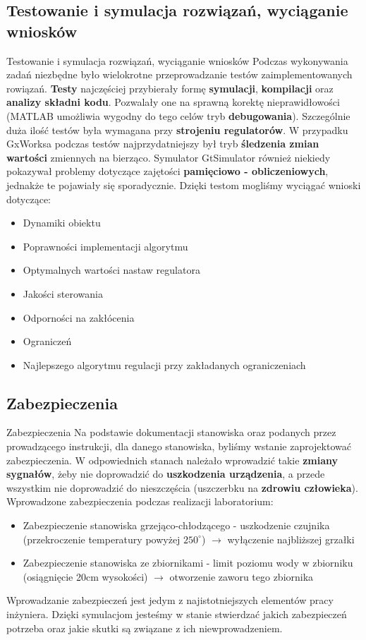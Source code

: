\documentclass{beamer}
\begin{document}
	\subsection{Testowanie i symulacja rozwiązań, wyciąganie wniosków}
	\begin{frame}{Testowanie i symulacja rozwiązań, wyciąganie wniosków}
		Podczas wykonywania zadań niezbędne było wielokrotne przeprowadzanie testów zaimplementowanych rowiązań. \textbf{Testy} najczęściej przybierały formę \textbf{symulacji}, \textbf{kompilacji} oraz \textbf{analizy składni kodu}. Pozwalały one na sprawną korektę nieprawidłowości (MATLAB umożliwia wygodny do tego celów tryb \textbf{debugowania}). Szczególnie duża ilość testów była wymagana przy \textbf{strojeniu regulatorów}. W przypadku GxWorksa podczas testów najprzydatniejszy był tryb \textbf{śledzenia zmian wartości} zmiennych na bierząco. Symulator GtSimulator również niekiedy pokazywał problemy dotyczące zajętości \textbf{pamięciowo - obliczeniowych}, jednakże te pojawiały się sporadycznie. Dzięki testom mogliśmy wyciągać wnioski dotyczące:
		\begin{itemize}
			\item Dynamiki obiektu
			\item Poprawności implementacji algorytmu
			\item Optymalnych wartości nastaw regulatora
			\item Jakości sterowania
			\item Odporności na zakłócenia
			\item Ograniczeń
			\item Najlepszego algorytmu regulacji przy zakładanych ograniczeniach
		\end{itemize}
	\end{frame}
	
	\subsection{Zabezpieczenia}
	\begin{frame}{Zabezpieczenia}
		Na podstawie dokumentacji stanowiska oraz podanych przez prowadzącego instrukcji, dla danego stanowiska, byliśmy wstanie zaprojektować zabezpieczenia. W odpowiednich stanach należało wprowadzić takie \textbf{zmiany sygnałów}, żeby nie doprowadzić do \textbf{uszkodzenia urządzenia}, a przede wszystkim nie doprowadzić do nieszczęścia (uszczerbku na \textbf{zdrowiu człowieka}). Wprowadzone zabezpieczenia podczas realizacji laboratorium:
		\begin{itemize}
			\item Zabezpieczenie stanowiska grzejąco-chłodzącego - uszkodzenie czujnika (przekroczenie temperatury powyżej $250^\circ$) $\rightarrow$ wyłączenie najbliższej grzałki
			\item Zabezpieczenie stanowiska ze zbiornikami - limit poziomu wody w zbiorniku (osiągnięcie 20cm wysokości) $\rightarrow$ otworzenie zaworu tego zbiornika
		\end{itemize}
		Wprowadzanie zabezpieczeń jest jedym z najistotniejszych elementów pracy inżyniera. Dzięki symulacjom jesteśmy w stanie stwierdzać jakich zabezpieczeń potrzeba oraz jakie skutki są związane z ich niewprowadzeniem.
	\end{frame}
\end{document}
